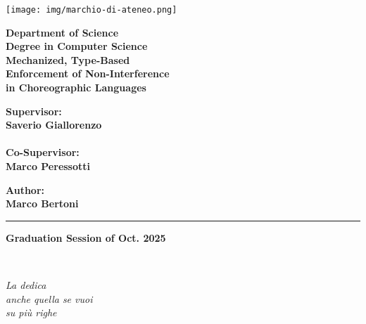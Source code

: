 \documentclass[12pt,a4paper,twoside]{book}
\begin{document}
\pagestyle{empty}

\begin{titlepage}
\begin{center}

\texttt{[image: img/marchio-di-ateneo.png]}

\vspace{10mm}
{\large{\bf{Department of Science}}}\\
\vspace{5mm}
{\Large{\bf{Degree in Computer Science}}}\\
\vspace{15mm}
{\Huge{\bf Mechanized, Type-Based}}\\
\vspace{1mm}
{\Huge{\bf Enforcement of Non-Interference}}\\
\vspace{2mm}
{\Huge{\bf in Choreographic Languages}}\\
\end{center}
\vspace{35mm}
\begin{minipage}[t]{0.40\textwidth}
{\Large{\bf Supervisor: \\ Saverio Giallorenzo}}\\
\vspace{3mm}\\
{\Large{\bf Co-Supervisor: \\ Marco Peressotti}}
\end{minipage}
\hfill
\begin{minipage}[t]{0.40\textwidth}\raggedleft
{\Large{\bf Author: \\ Marco Bertoni}}
\end{minipage}

\vspace{35mm}
\rule[0.5cm]{15.8cm}{0.6mm}
\begin{center}
{\large{\bf Graduation Session of Oct. 2025\\}}

\end{center}
\end{titlepage}
\restoregeometry

\newpage~\newpage

\topmargin=6.5cm
\begin{flushright}
\emph{
\LARGE{La dedica}\\\vspace{2mm}
\LARGE{anche quella se vuoi}\\\vspace{3mm} 
\LARGE{su più righe} 
}
\end{flushright}
\end{document}
